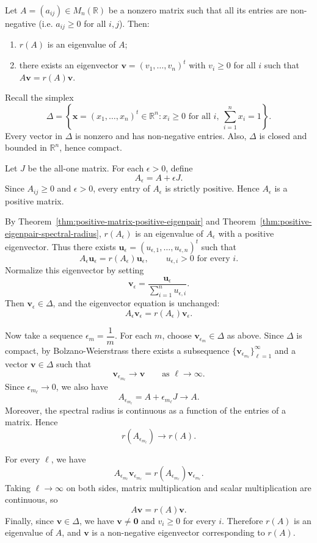 \begin{theorem}
\label{thm:pf-existence-nonnegative}
Let $A=(a_{ij})\in M_n(\mathbb{R})$ be a nonzero matrix such that all its entries are non-negative (i.e. $a_{ij}\ge 0$ for all $i,j$). Then:
\begin{enumerate}
    \item $r(A)$ is an eigenvalue of $A$;
    \item there exists an eigenvector $\mathbf{v}=(v_1,\dots,v_n)^t$ with $v_i\ge 0$ for all $i$ such that $A\mathbf{v}=r(A)\mathbf{v}$.
\end{enumerate}
\end{theorem}

\begin{pfbox}
Recall the simplex
\[
\Delta
=
\left\{
\mathbf{x}=(x_1,\dots,x_n)^t\in\mathbb{R}^n:
x_i\ge 0\text{ for all }i,\ 
\sum_{i=1}^n x_i=1
\right\}.
\]
Every vector in $\Delta$ is nonzero and has non-negative entries. Also, $\Delta$ is closed and bounded in $\mathbb{R}^n$, hence compact.

Let $J$ be the all-one matrix. For each $\epsilon>0$, define
\[
A_\epsilon
=
A+\epsilon J.
\]
Since $A_{ij}\ge0$ and $\epsilon>0$, every entry of $A_\epsilon$ is strictly positive. Hence $A_\epsilon$ is a positive matrix.

By Theorem~\eqref{thm:positive-matrix-positive-eigenpair} and Theorem~\eqref{thm:positive-eigenpair-spectral-radius}, $r(A_\epsilon)$ is an eigenvalue of $A_\epsilon$ with a positive eigenvector. Thus there exists $\mathbf{u}_\epsilon=(u_{\epsilon,1},\dots,u_{\epsilon,n})^t$ such that
\[
A_\epsilon\mathbf{u}_\epsilon
=
r(A_\epsilon)\mathbf{u}_\epsilon,
\qquad
u_{\epsilon,i}>0
\text{ for every }i.
\]
Normalize this eigenvector by setting
\[
\mathbf{v}_\epsilon
=
\frac{\mathbf{u}_\epsilon}{\displaystyle\sum_{i=1}^n u_{\epsilon,i}}.
\]
Then $\mathbf{v}_\epsilon\in\Delta$, and the eigenvector equation is unchanged:
\[
A_\epsilon\mathbf{v}_\epsilon
=
r(A_\epsilon)\mathbf{v}_\epsilon.
\]

Now take a sequence $\epsilon_m=\dfrac{1}{m}$. For each $m$, choose $\mathbf{v}_{\epsilon_m}\in\Delta$ as above. Since $\Delta$ is compact, by Bolzano-Weierstrass there exists a subsequence $\{\mathbf{v}_{\epsilon_{m_\ell}}\}_{\ell=1}^\infty$ and a vector $\mathbf{v}\in\Delta$ such that
\[
\mathbf{v}_{\epsilon_{m_\ell}}
\longrightarrow
\mathbf{v}
\qquad
\text{as }\ell\to\infty.
\]
Since $\epsilon_{m_\ell}\to0$, we also have
\[
A_{\epsilon_{m_\ell}}
=
A+\epsilon_{m_\ell}J
\longrightarrow
A.
\]
Moreover, the spectral radius is continuous as a function of the entries of a matrix. Hence
\[
r(A_{\epsilon_{m_\ell}})
\longrightarrow
r(A).
\]

For every $\ell$, we have
\[
A_{\epsilon_{m_\ell}}\mathbf{v}_{\epsilon_{m_\ell}}
=
r(A_{\epsilon_{m_\ell}})\mathbf{v}_{\epsilon_{m_\ell}}.
\]
Taking $\ell\to\infty$ on both sides, matrix multiplication and scalar multiplication are continuous, so
\[
A\mathbf{v}
=
r(A)\mathbf{v}.
\]
Finally, since $\mathbf{v}\in\Delta$, we have $\mathbf{v}\neq\mathbf{0}$ and $v_i\ge0$ for every $i$. Therefore $r(A)$ is an eigenvalue of $A$, and $\mathbf{v}$ is a non-negative eigenvector corresponding to $r(A)$.
\end{pfbox}
